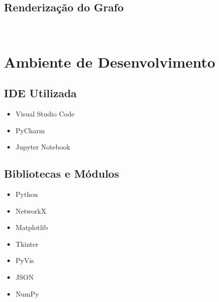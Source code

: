 \documentclass[12pt,a4paper]{article}
\begin{document}
\begin{lstlisting}[style=ravenstyle, language=Python]



\end{lstlisting}

\vspace{0.5cm}

\subsection{Renderização do Grafo}

\begin{lstlisting}[style=ravenstyle, language=Python]



\end{lstlisting}


\section{Ambiente de Desenvolvimento}

\subsection{IDE Utilizada}

\begin{itemize}

    \item Visual Studio Code
    \item PyCharm
    \item Jupyter Notebook

\end{itemize}

\vspace{0.5cm}

\subsection{Bibliotecas e Módulos}

\begin{itemize}

    \item Python
    \item NetworkX
    \item Matplotlib
    \item Tkinter
    \item PyVis
    \item JSON
    \item NumPy

\end{itemize}
\end{document}
